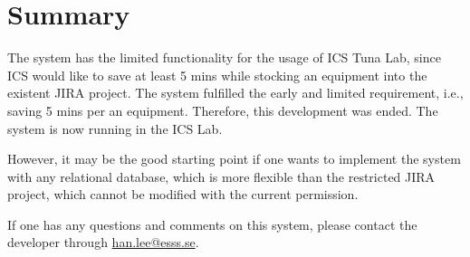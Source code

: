 \documentclass[11pt
  , a4paper
  , article
  , oneside
  , showtrims
]{memoir}
\begin{document}
\chapter{Summary}

The system has the limited functionality for the usage of ICS Tuna Lab, since ICS would like to save at least 5 mins while stocking an equipment into the existent JIRA project. The system fulfilled the early and limited requirement, i.e., saving 5 mins per an equipment. Therefore, this development was ended. The system is now running in the ICS Lab. 

However, it may be the good starting point if one wants to implement the system with any relational database, which is more flexible than the restricted JIRA project, which cannot be modified with the current permission.

If one has any questions and comments on this system, please contact the developer through \href{mailto:han.lee@esss.se}{han.lee@esss.se}.
\end{document}
